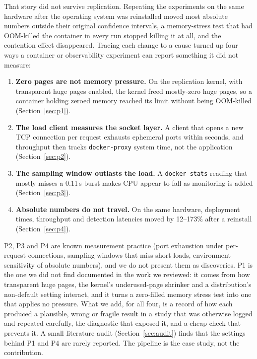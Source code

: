 \documentclass[conference]{IEEEtran}
\begin{document}
\label{sec:intro-pitfalls}That story did not survive replication. Repeating the experiments on the same
hardware after the operating system was reinstalled moved most absolute numbers
outside their original confidence intervals, a memory-stress test that had
OOM-killed the container in every run stopped killing it at all, and the contention
effect disappeared. Tracing each change to a cause turned up four ways a container
or observability experiment can report something it did not measure:
\begin{enumerate}
\item[\textbf{P1.}] \textbf{Zero pages are not memory pressure.} On the replication
kernel, with transparent huge pages enabled, the kernel freed mostly-zero huge pages, so a
container holding zeroed memory reached its limit without being OOM-killed
(Section~\ref{sec:p1}).
\item[\textbf{P2.}] \textbf{The load client measures the socket layer.} A client that
opens a new TCP connection per request exhausts ephemeral ports within seconds, and
throughput then tracks \texttt{docker-proxy} system time, not the application
(Section~\ref{sec:p2}).
\item[\textbf{P3.}] \textbf{The sampling window outlasts the load.} A \texttt{docker
stats} reading that mostly misses a 0.11\,s burst makes CPU appear to fall as monitoring
is added (Section~\ref{sec:p3}).
\item[\textbf{P4.}] \textbf{Absolute numbers do not travel.} On the same hardware,
deployment times, throughput and detection latencies moved by 12--173\% after a reinstall
(Section~\ref{sec:p4}).
\end{enumerate}
P2, P3 and P4 are known measurement practice (port exhaustion under per-request
connections, sampling windows that miss short loads, environment sensitivity of absolute
numbers), and we do not present them as discoveries. P1 is the one we did not find
documented in the work we reviewed: it comes from how transparent huge pages, the kernel's
underused-page shrinker and a distribution's non-default setting interact, and it
turns a zero-filled memory stress test into one that applies no pressure. What we add, for
all four, is a record of how each produced a plausible, wrong or fragile result in a study
that was otherwise logged and repeated carefully, the diagnostic that exposed it, and a
cheap check that prevents it. A small literature audit (Section~\ref{sec:audit}) finds
that the settings behind P1 and P4 are rarely reported. The pipeline is the case study, not the contribution.
\end{document}

